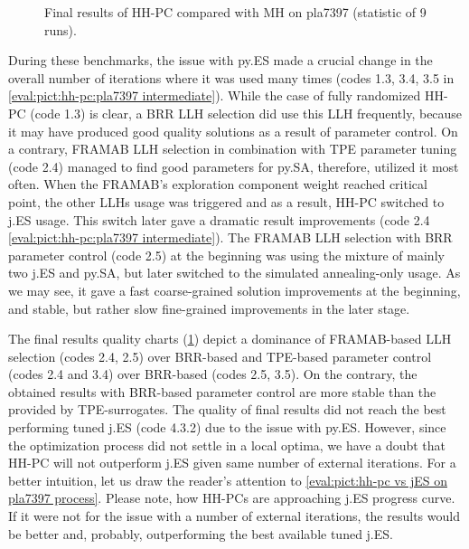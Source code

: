 \begin{figure}[b]
	\centering
	\vspace{-20pt}
	
	\caption{Final results of HH-PC compared with MH on pla7397 (statistic of 9 runs).}
	\vspace{-5pt}
	\label{eval:pict:hh-pc:pla7397 final}
\end{figure}

During these benchmarks, the issue with py.ES made a crucial change in the overall number of iterations where it was used many times (codes 1.3, 3.4, 3.5 in \cref{eval:pict:hh-pc:pla7397 intermediate}). While the case of fully randomized HH-PC (code 1.3) is clear, a BRR LLH selection did use this LLH frequently, because it may have produced good quality solutions as a result of parameter control. On a contrary, FRAMAB LLH selection in combination with TPE parameter tuning (code 2.4) managed to find good parameters for py.SA, therefore, utilized it most often. When the FRAMAB's exploration component weight reached critical point, the other LLHs usage was triggered and as a result, HH-PC switched to j.ES usage. This switch later gave a dramatic result improvements (code 2.4 \cref{eval:pict:hh-pc:pla7397 intermediate}). The FRAMAB LLH selection with BRR parameter control (code 2.5) at the beginning was using the mixture of mainly two j.ES and py.SA, but later switched to the simulated annealing-only usage. As we may see, it gave a fast coarse-grained solution improvements at the beginning, and stable, but rather slow fine-grained improvements in the later stage.

The final results quality charts (\cref{eval:pict:hh-pc:pla7397 final}) depict a dominance of FRAMAB-based LLH selection (codes 2.4, 2.5) over BRR-based and TPE-based parameter control (codes 2.4 and 3.4) over BRR-based (codes 2.5, 3.5). On the contrary, the obtained results with BRR-based parameter control are more stable than the provided by TPE-surrogates. The quality of final results did not reach the best performing tuned j.ES (code 4.3.2) due to the issue with py.ES. However, since the optimization process did not settle in a local optima, we have a doubt that HH-PC will not outperform j.ES given same number of external iterations. For a better intuition, let us draw the reader's attention to \cref{eval:pict:hh-pc vs jES on pla7397 process}. Please note, how HH-PCs are approaching j.ES progress curve. If it were not for the issue with a number of external iterations, the results would be better and, probably, outperforming the best available tuned j.ES.

